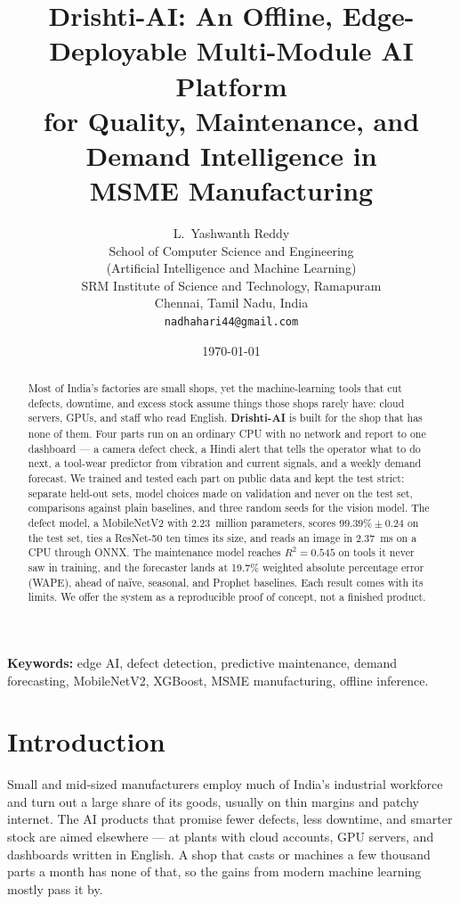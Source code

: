 \documentclass[12pt]{article}
\title{\textbf{Drishti-AI: An Offline, Edge-Deployable Multi-Module AI Platform\\
for Quality, Maintenance, and Demand Intelligence in\\ MSME Manufacturing}}
\author{L.~Yashwanth Reddy \\
  \small School of Computer Science and Engineering \\
  \small (Artificial Intelligence and Machine Learning) \\
  \small SRM Institute of Science and Technology, Ramapuram \\
  \small Chennai, Tamil Nadu, India \\
  \small \texttt{nadhahari44@gmail.com}}
\date{\today}
\begin{document}
\maketitle

\begin{abstract}
\noindent
Most of India's factories are small shops, yet the machine-learning tools that
cut defects, downtime, and excess stock assume things those shops rarely have:
cloud servers, GPUs, and staff who read English. \textbf{Drishti-AI} is built for
the shop that has none of them. Four parts run on an ordinary CPU with no network
and report to one dashboard --- a camera defect check, a Hindi alert that tells
the operator what to do next, a tool-wear predictor from vibration and current
signals, and a weekly demand forecast. We trained and tested each part on public
data and kept the test strict: separate held-out sets, model choices made on
validation and never on the test set, comparisons against plain baselines, and
three random seeds for the vision model. The defect model, a MobileNetV2 with
2.23~million parameters, scores $99.39\% \pm 0.24$ on the test set, ties a
ResNet-50 ten times its size, and reads an image in 2.37~ms on a CPU through
ONNX. The maintenance model reaches $R^2 = 0.545$ on tools it never saw in
training, and the forecaster lands at 19.7\% weighted absolute percentage error
(WAPE), ahead of naïve, seasonal, and Prophet baselines. Each result comes with
its limits. We offer the system as a reproducible proof of concept, not a
finished product.
\end{abstract}

\textbf{Keywords:} edge AI, defect detection, predictive maintenance, demand
forecasting, MobileNetV2, XGBoost, MSME manufacturing, offline inference.

\section{Introduction}

Small and mid-sized manufacturers employ much of India's industrial workforce and
turn out a large share of its goods, usually on thin margins and patchy internet.
The AI products that promise fewer defects, less downtime, and smarter stock are
aimed elsewhere --- at plants with cloud accounts, GPU servers, and dashboards
written in English. A shop that casts or machines a few thousand parts a month has
none of that, so the gains from modern machine learning mostly pass it by.
\end{document}
